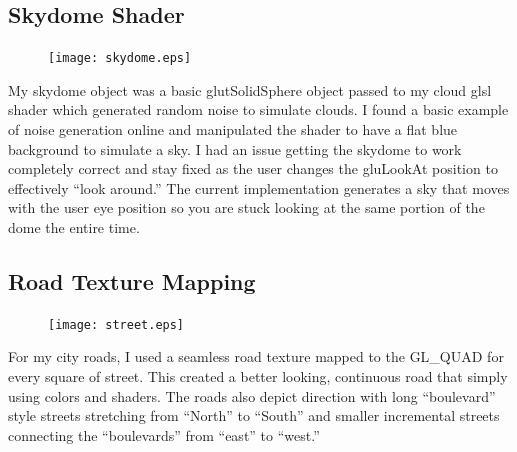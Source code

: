 \documentclass[journal,10pt,onecolumn,compsoc]{IEEEtran}
\begin{document}
\subsection{Skydome Shader}
\begin{center} 
    \begin{figure}[H]
        \centering
        \texttt{[image: skydome.eps]}
    \end{figure}
\end{center} 
\noindent My skydome object was a basic glutSolidSphere object passed to my cloud glsl shader which generated random noise to simulate clouds. I found a basic example of noise generation online and manipulated the shader to have a flat blue background to simulate a sky. I had an issue getting the skydome to work completely correct and stay fixed as the user changes the gluLookAt position to effectively ``look around.'' The current implementation generates a sky that moves with the user eye position so you are stuck looking at the same portion of the dome the entire time.
\subsection{Road Texture Mapping}
\begin{center} 
  \begin{figure}[H]
      \centering
      \texttt{[image: street.eps]}
  \end{figure}
\end{center}  
For my city roads, I used a seamless road texture mapped to the GL\_QUAD for every square of street. This created a better looking, continuous road that simply using colors and shaders. The roads also depict direction with long ``boulevard'' style streets stretching from ``North'' to ``South'' and smaller incremental streets connecting the ``boulevards'' from ``east'' to ``west.''
\end{document}
